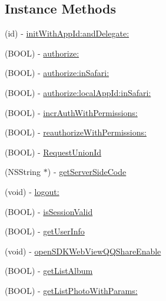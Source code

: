 \subsection*{Instance Methods}
\begin{DoxyCompactItemize}
\item 
(id) -\/ \mbox{\hyperlink{interface_tencent_o_auth_ab9fec0e89d909e69750911ce59d0d7f4}{init\+With\+App\+Id\+:and\+Delegate\+:}}
\item 
(B\+O\+OL) -\/ \mbox{\hyperlink{interface_tencent_o_auth_a996be450c28db1855873e0853b9fcf27}{authorize\+:}}
\item 
(B\+O\+OL) -\/ \mbox{\hyperlink{interface_tencent_o_auth_a6e5dc1555fb4a0fe063dfff83b12c9e5}{authorize\+:in\+Safari\+:}}
\item 
(B\+O\+OL) -\/ \mbox{\hyperlink{interface_tencent_o_auth_aadc37e11bb06fe26f11eb0b8b0165229}{authorize\+:local\+App\+Id\+:in\+Safari\+:}}
\item 
(B\+O\+OL) -\/ \mbox{\hyperlink{interface_tencent_o_auth_abe9ca35d1c305cc9219cb6738606df2d}{incr\+Auth\+With\+Permissions\+:}}
\item 
(B\+O\+OL) -\/ \mbox{\hyperlink{interface_tencent_o_auth_a0cae2d11a0ac52e1877a05c05100669d}{reauthorize\+With\+Permissions\+:}}
\item 
(B\+O\+OL) -\/ \mbox{\hyperlink{interface_tencent_o_auth_a8161f0a4e6a3398ecae478e515915e3a}{Request\+Union\+Id}}
\item 
(N\+S\+String $\ast$) -\/ \mbox{\hyperlink{interface_tencent_o_auth_a6cf5e8f4d122592e70fb82076a0cd8d3}{get\+Server\+Side\+Code}}
\item 
(void) -\/ \mbox{\hyperlink{interface_tencent_o_auth_a6f92b7e58f66ab4657107139c2d2f05b}{logout\+:}}
\item 
(B\+O\+OL) -\/ \mbox{\hyperlink{interface_tencent_o_auth_ae8ab093ff77ef33286e1809736d2609b}{is\+Session\+Valid}}
\item 
(B\+O\+OL) -\/ \mbox{\hyperlink{interface_tencent_o_auth_a442df11581fef0f224ad8c1abfb52c0a}{get\+User\+Info}}
\item 
(void) -\/ \mbox{\hyperlink{interface_tencent_o_auth_aafe5fa40dc8b6ff0f7bb3d72bbecd663}{open\+S\+D\+K\+Web\+View\+Q\+Q\+Share\+Enable}}
\item 
(B\+O\+OL) -\/ \mbox{\hyperlink{interface_tencent_o_auth_a92728cf8bb95d933d06eca5b0109b200}{get\+List\+Album}}
\item 
(B\+O\+OL) -\/ \mbox{\hyperlink{interface_tencent_o_auth_ae60ab4bbb851f267106ee4889e5d9f81}{get\+List\+Photo\+With\+Params\+:}}

\end{DoxyCompactItemize}
